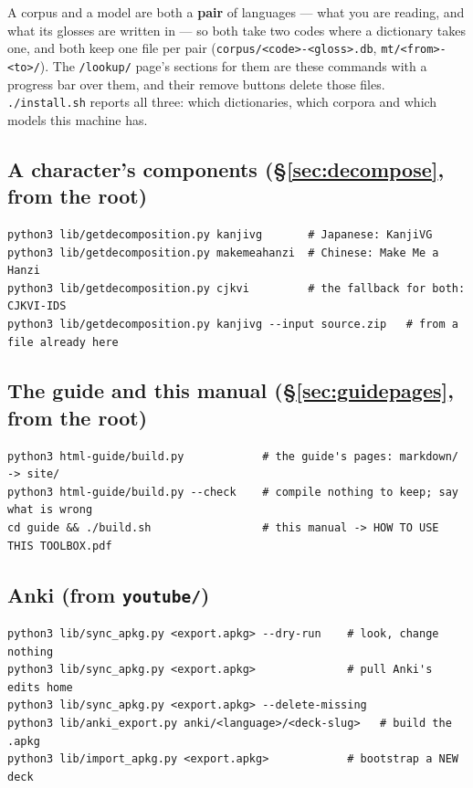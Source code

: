 \documentclass[11pt,oneside]{report}
\newcommand{\file}[1]{\texttt{#1}}
\newcommand{\menu}[1]{\textsf{#1}}
\begin{document}
A corpus and a model are both a \textbf{pair} of languages --- what you are
reading, and what its glosses are written in --- so both take two codes where
a dictionary takes one, and both keep one file per pair
(\file{corpus/<code>-<gloss>.db}, \file{mt/<from>-<to>/}). The
\texttt{/lookup/} page's sections for them are these commands with a
progress bar over them, and their \menu{remove} buttons delete those files.
\file{./install.sh} reports all three: which dictionaries, which corpora and
which models this machine has.

\subsection*{A character's components (\S\ref{sec:decompose}, from the root)}
\begin{lstlisting}
python3 lib/getdecomposition.py kanjivg       # Japanese: KanjiVG
python3 lib/getdecomposition.py makemeahanzi  # Chinese: Make Me a Hanzi
python3 lib/getdecomposition.py cjkvi         # the fallback for both: CJKVI-IDS
python3 lib/getdecomposition.py kanjivg --input source.zip   # from a file already here
\end{lstlisting}

\subsection*{The guide and this manual (\S\ref{sec:guidepages}, from the root)}
\begin{lstlisting}
python3 html-guide/build.py            # the guide's pages: markdown/ -> site/
python3 html-guide/build.py --check    # compile nothing to keep; say what is wrong
cd guide && ./build.sh                 # this manual -> HOW TO USE THIS TOOLBOX.pdf
\end{lstlisting}

\subsection*{Anki (from \file{youtube/})}
\begin{lstlisting}
python3 lib/sync_apkg.py <export.apkg> --dry-run    # look, change nothing
python3 lib/sync_apkg.py <export.apkg>              # pull Anki's edits home
python3 lib/sync_apkg.py <export.apkg> --delete-missing
python3 lib/anki_export.py anki/<language>/<deck-slug>   # build the .apkg
python3 lib/import_apkg.py <export.apkg>            # bootstrap a NEW deck
\end{lstlisting}
\end{document}
